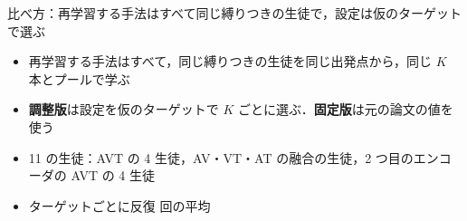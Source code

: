 \begin{frame}{比べ方：再学習する手法はすべて同じ縛りつきの生徒で，設定は仮のターゲットで選ぶ}
  \vspace{0.3em}
  \begin{itemize}\footnotesize\setlength{\itemsep}{9pt}
        \item 再学習する手法はすべて，同じ縛りつきの生徒を同じ出発点から，同じ $K$ 本とプールで学ぶ
        \item \textbf{調整版}は設定を仮のターゲットで $K$ ごとに選ぶ．\textbf{固定版}は元の論文の値を使う
        \item 11 の生徒：AVT の 4 生徒，AV・VT・AT の融合の生徒，2 つ目のエンコーダの AVT の 4 生徒
        \item ターゲットごとに反復  回の平均
      \end{itemize}
\end{frame}

